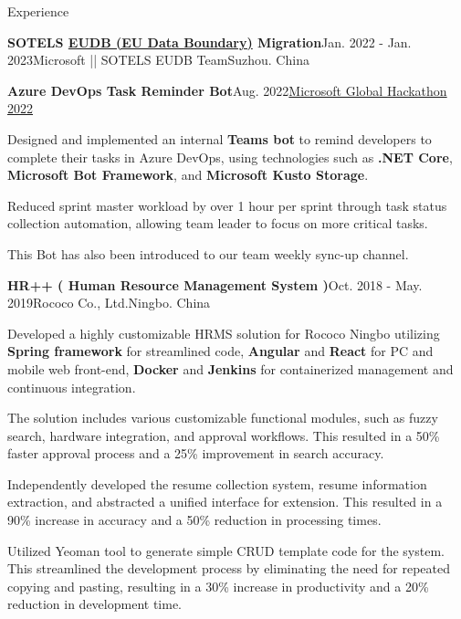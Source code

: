 \documentclass[a4paper]{resume} %
\begin{document}
\begin{rSection}{\large Experience}
\begin{rSubsection}{\textbf{\large{SOTELS {\href{https://www.microsoft.com/en-us/trust-center/privacy/european-data-boundary-eudb}{EUDB (EU Data Boundary)}} Migration}}}{Jan. 2022 - Jan. 2023}{Microsoft || SOTELS EUDB Team}{Suzhou. China}
\end{rSubsection}

\begin{rSubsection}{\textbf{\large{Azure DevOps Task Reminder Bot}}}{Aug. 2022}{\href{https://www.credly.com/badges/0a38f67f-44fb-4788-84ff-878430066bc8/linked_in_profile}{Microsoft Global Hackathon 2022}}

\item Designed and implemented an internal \textbf{Teams bot} to remind developers to complete their tasks in Azure DevOps, using technologies such as \textbf{.NET Core}, \textbf{Microsoft Bot Framework}, and \textbf{Microsoft Kusto Storage}.
\item Reduced sprint master workload by over 1 hour per sprint through task status collection automation, allowing team leader to focus on more critical tasks.
\item This Bot has also been introduced to our team weekly sync-up channel.

\end{rSubsection}

\begin{rSubsection}{\textbf{\large{HR++ ( Human Resource Management System )}}}{Oct. 2018 - May. 2019}{Rococo Co., Ltd.}{Ningbo. China}

\item Developed a highly customizable HRMS solution for Rococo Ningbo utilizing \textbf{Spring framework} for streamlined code, \textbf{Angular} and \textbf{React} for PC and mobile web front-end, \textbf{Docker} and \textbf{Jenkins} for containerized management and continuous integration. 
\item The solution includes various customizable functional modules, such as fuzzy search, hardware integration, and approval workflows. This resulted in a 50\% faster approval process and a 25\% improvement in search accuracy.
\item Independently developed the resume collection system, resume information extraction, and abstracted a unified interface for extension. This resulted in a 90\% increase in accuracy and a 50\% reduction in processing times.
\item Utilized Yeoman tool to generate simple CRUD template code for the system. This streamlined the development process by eliminating the need for repeated copying and pasting, resulting in a 30\% increase in productivity and a 20\% reduction in development time.

\end{rSubsection}

\end{rSection}
\end{document}
